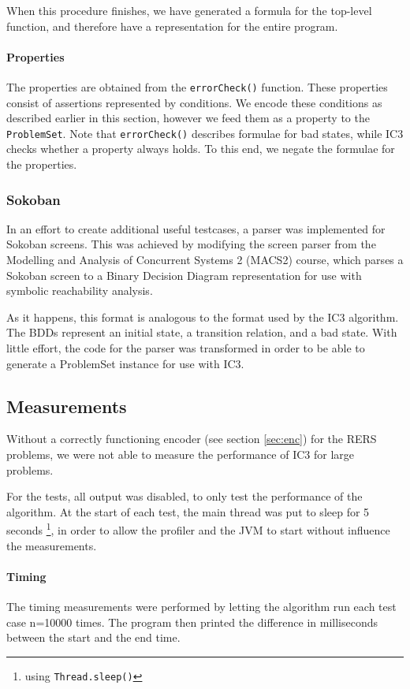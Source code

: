 \documentclass[a4paper]{article}
\begin{document}
When this procedure finishes, we have generated a formula for the top-level function, and therefore have a representation for the entire program.

\paragraph{Properties}
The properties are obtained from the \texttt{errorCheck()} function. These properties consist of assertions represented by conditions. We encode these conditions as described earlier in this section, however we feed them as a property to the \texttt{ProblemSet}. Note that \texttt{errorCheck()} describes formulae for bad states, while IC3 checks whether a property always holds. To this end, we negate the formulae for the properties.

\subsubsection{Sokoban}
In an effort to create additional useful testcases, a parser was implemented for Sokoban screens. 
This was achieved by modifying the screen parser from the Modelling and Analysis of Concurrent Systems 2 (MACS2) course, which parses a Sokoban screen to a Binary Decision Diagram representation for use with symbolic reachability analysis.

As it happens, this format is analogous to the format used by the IC3 algorithm. The BDDs represent an initial state, a transition relation, and a bad state.
With little effort, the code for the parser was transformed in order to be able to generate a ProblemSet instance for use with IC3.

\subsection{Measurements}
Without a correctly functioning encoder (see section \ref{sec:enc}) for the RERS problems, we were not able to measure the performance of IC3 for large problems.

For the tests, all output was disabled, to only test the performance of the algorithm. At the start of each test, the main thread was put to sleep for 5 seconds \footnote{using \texttt{Thread.sleep()}}, in order to allow the profiler and the JVM to start without influence the measurements.

\paragraph{Timing}
The timing measurements were performed by letting the algorithm run each test case n=10000 times. The program then printed the difference in milliseconds between the start and the end time.
\end{document}
